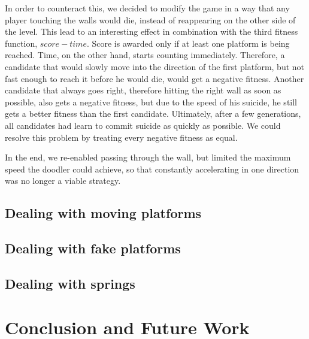 \documentclass[a4paper,12pt,pagesize,headsepline,bibtotoc,titlepage,abstracton]{scrartcl}
\begin{document}
In order to counteract this, we decided to modify the game in a way that any player touching the walls would die, instead of reappearing on the other side of the level. This lead to an interesting effect in combination with the third fitness function, $score - time$. Score is awarded only if at least one platform is being reached. Time, on the other hand, starts counting immediately. Therefore, a candidate that would slowly move into the direction of the first platform, but not fast enough to reach it before he would die, would get a negative fitness. Another candidate that always goes right, therefore hitting the right wall as soon as possible, also gets a negative fitness, but due to the speed of his suicide, he still gets a better fitness than the first candidate. Ultimately, after a few generations, all candidates had learn to commit suicide as quickly as possible. We could resolve this problem by treating every negative fitness as equal.

In the end, we re-enabled passing through the wall, but limited the maximum speed the doodler could achieve, so that constantly accelerating in one direction was no longer a viable strategy.

\subsection{Dealing with moving platforms}
\subsection{Dealing with fake platforms}
\subsection{Dealing with springs}
\section{Conclusion and Future Work}
\label{sec:cafw}

\newpage

 
\end{document}
